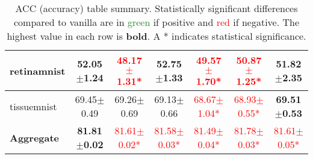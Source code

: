 \documentclass{article}
\begin{document}
\begin{table}[h]
{\begin{tabular}{l|cccccc}
        retinamnist & 52.05$\pm$1.24 & \textcolor{red}{48.17$\pm$1.31*} & \textbf{52.75$\pm$1.33} & \textcolor{red}{49.57$\pm$1.70*} & \textcolor{red}{50.87$\pm$1.25*} & 51.82$\pm$2.35 \\ \hline
        tissuemnist & 69.45$\pm$0.49 & 69.26$\pm$0.69 & 69.13$\pm$0.66 & \textcolor{red}{68.67$\pm$1.04*} & \textcolor{red}{68.93$\pm$0.55*} & \textbf{69.51$\pm$0.53} \\ \hline
        \textbf{Aggregate} & \textbf{81.81$\pm$0.02} & \textcolor{red}{81.61$\pm$0.02*} & \textcolor{red}{81.58$\pm$0.03*} & \textcolor{red}{81.49$\pm$0.04*} & \textcolor{red}{81.78$\pm$0.03*} & \textcolor{red}{81.61$\pm$0.05*} \\ \hline
    \end{tabular}
    }
    \caption{ACC (accuracy) table summary. Statistically significant differences compared to vanilla are in \textcolor{ForestGreen}{green} if positive and \textcolor{red}{red} if negative. The highest value in each row is \textbf{bold}. A * indicates statistical significance.}
    \label{tab:results}
\end{table}
\end{document}

